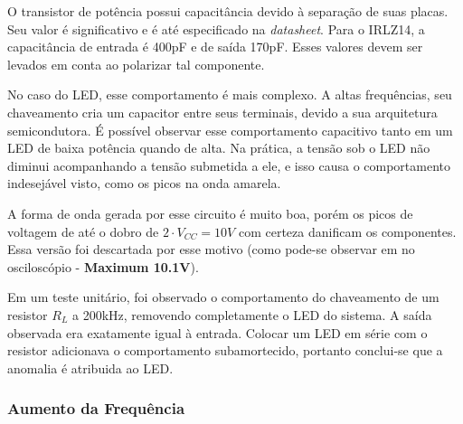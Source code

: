 	O transistor de potência possui capacitância devido à separação de suas placas. Seu valor é significativo e é até especificado na \textit{datasheet}. Para o IRLZ14, a capacitância de entrada é 400pF e de saída 170pF. Esses valores devem ser levados em conta ao polarizar tal componente. 

	No caso do LED, esse comportamento é mais complexo. A altas frequências, seu chaveamento cria um capacitor entre seus terminais, devido a sua arquitetura semicondutora. É possível observar esse comportamento capacitivo tanto em um LED de baixa potência quando de alta. Na prática, a tensão sob o LED não diminui acompanhando a tensão submetida a ele, e isso causa o comportamento indesejável visto, como os picos na onda amarela.
	
	A forma de onda gerada por esse circuito é muito boa, porém os picos de voltagem de até o dobro de $2 \cdot V_{CC} = 10V$ com certeza danificam os componentes. Essa versão foi descartada por esse motivo (como pode-se observar em no osciloscópio - \textbf{Maximum 10.1V}). 
	
	Em um teste unitário, foi observado o comportamento do chaveamento de um resistor $R_{L}$ a 200kHz, removendo completamente o LED do sistema. A saída observada era exatamente igual à entrada. Colocar um LED em série com o resistor adicionava o comportamento subamortecido, portanto conclui-se que a anomalia é atribuida ao LED.
	
	\subsubsection{Aumento da Frequência}

